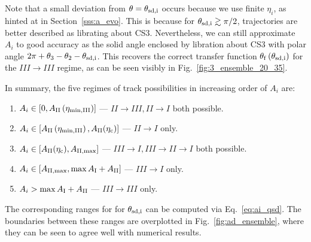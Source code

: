 \documentclass[
        fleqn,
        usenatbib,
        referee,
    ]{mnras}
\newcommand*{\p}[1]{\left(#1\right)}
\newcommand*{\s}[1]{\left[#1\right]}
\begin{document}
\begin{enumerate}
        Note that a small deviation from $\theta = \theta_{\rm sd, i}$ occurs
        because we use finite $\eta_i$, as hinted at in Section~\ref{sss:a_evo}.
        This is because for $\theta_{\rm sd, i} \gtrsim \pi/2$, trajectories are
        better described as librating about CS3. Nevertheless, we can still
        approximate $A_i$ to good accuracy as the solid angle enclosed by
        libration about CS3 with polar angle $2\pi + \theta_3 - \theta_2 -
        \theta_{\rm sd, i}$. This recovers the correct transfer function
        $\theta_{\rm f}\p{\theta_{\rm sd, i}}$ for the $III \to III$ regime, as
        can be seen visibly in Fig.~\ref{fig:3_ensemble_20_35}.
\end{enumerate}
In summary, the five regimes of track possibilities in increasing order of $A_i$
are:
\begin{enumerate}
    \item $A_i \in \s{0, A_{\rm II}\p{\eta_{\rm \min, III}}}$ --- $II \to III,
        II \to I$ both possible.

    \item $A_i \in \s{A_{\rm II}\p{\eta_{\rm \min, III}}, A_{\rm II}(\eta_{\rm c})}$
        --- $II \to I$ only.

    \item $A_i \in \s{A_{\rm II}(\eta_{\rm c}), A_{\rm II, \max}}$ --- $III \to I, III
        \to II \to I$ both possible.

    \item $A_i \in \s{A_{\rm II, \max}, \max A_{\rm I} + A_{\rm II}}$ --- $III
        \to I$ only.

    \item $A_i > \max A_{\rm I} + A_{\rm II}$ --- $III \to III$ only.
\end{enumerate}
The corresponding ranges for for $\theta_{\rm sd,i}$ can be computed via
Eq.~\eqref{eq:ai_qsd}. The boundaries between these ranges are overplotted in
Fig.~\ref{fig:ad_ensemble}, where they can be seen to agree well with numerical
results.
\end{document}

